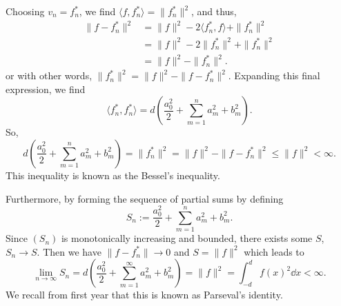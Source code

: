 \documentclass[
]{article}
\theoremstyle{definition}
\theoremstyle{definition}
\begin{document}
Choosing \(v_n = f_n^*\), we find
\(\langle f, f_n^* \rangle = \|f_n^*\|^2\), and thus, \[\begin{split}
  \| f - f_n^* \|^2 & = \|f\|^2 - 2 \langle f_n^*, f \rangle + \|f_n^*\|^2\\
  & = \|f\|^2 - 2 \|f_n^*\|^2 + \|f_n^*\|^2\\
  & = \|f\|^2 - \|f_n^*\|^2.
\end{split}\] or with other words,
\(\|f_n^*\|^2 = \|f\|^2 - \|f - f_n^*\|^2\). Expanding this final
expression, we find
\[\langle f_n^*, f_n^* \rangle = d \left(\frac{a_0^2}{2} + \sum_{m = 1}^n a_m^2 + b_m^2\right).\]
So,
\[d \left(\frac{a_0^2}{2} + \sum_{m = 1}^n a_m^2 + b_m^2\right) = \|f_n^*\|^2 = 
\|f\|^2 - \|f - f_n^*\|^2 \le \|f\|^2 < \infty.\] This inequality is
known as the Bessel's inequality.

Furthermore, by forming the sequence of partial sums by defining
\[S_n := \frac{a_0^2}{2} + \sum_{m = 1}^n a_m^2 + b_m^2.\] Since
\((S_n)\) is monotonically increasing and bounded, there exists some
\(S\), \(S_n \to S\). Then we have \(\|f - f_n^*\| \to 0\) and
\(S = \|f\|^2\) which leads to
\[\lim_{n \to \infty} S_n = d\left(\frac{a_0^2}{2} + \sum_{m = 1}^\infty a_m^2 + b_m^2 \right) 
 = \|f\|^2 = \int_{-d}^d f(x)^2 \dd x < \infty.\] We recall from first
year that this is known as Parseval's identity.
\end{document}
